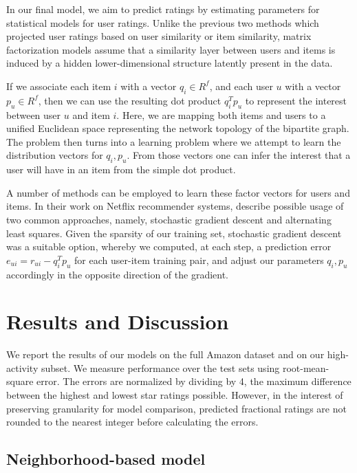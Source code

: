 \documentclass[letterpaper, 10 pt, twocolumn]{article}
\begin{document}
In our final model, we aim to predict ratings by estimating
parameters for statistical models for user ratings. Unlike the previous
two methods which projected user ratings based on user similarity or
item similarity, matrix factorization models assume that a similarity layer
between users and items is induced by a hidden lower-dimensional structure
latently present in the data.

If we associate each item $i$ with a vector $q_i \in R^f$, and each user $u$ with a
vector $p_u \in R^f$, then we can use the resulting dot product $q_i^Tp_u$ to represent
the interest between user $u$ and item $i$.
Here, we are mapping both items and users to a unified Euclidean space
representing the network topology of the bipartite graph.
The problem then turns into a
learning problem where we attempt to learn the distribution vectors for
$q_i,p_u$. From those vectors one can infer the interest that a user will
have in an item from the simple dot product.

A number of methods can be employed to learn these factor vectors for
users and items. In their work on Netflix recommender systems,
\cite{bib:bellkor} describe possible usage of two common approaches, namely,
stochastic gradient descent and alternating least squares. Given the
sparsity of our training set, stochastic gradient descent was a suitable
option, whereby we computed, at each step, a prediction error $e_{ui}
=r_{ui}-q_i^Tp_u$ for each user-item training pair, and adjust our
parameters $q_i,p_u$ accordingly in the opposite direction of the gradient.


\section{Results and Discussion}
\label{sec:results}

We report the results of our models on the full Amazon dataset and on our 
high-activity subset. We measure performance over the test sets using 
root-mean-square error. The errors are normalized by dividing by 4, the maximum 
difference between the highest and lowest star ratings possible. However, 
in the interest of preserving granularity for model comparison, predicted
fractional ratings are not rounded to the nearest integer before calculating 
the errors. 

\subsection{Neighborhood-based model}
\end{document}
